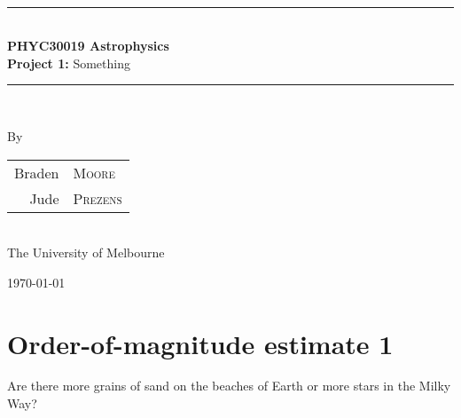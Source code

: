 \documentclass[a4paper]{article} %
\begin{document}
\pagestyle{empty}

\newcommand{\HRule}{\rule{\linewidth}{0.5mm}}

\begin{titlepage}

    \begin{center}
        \textsc{}\\[3cm]

        \HRule \\[0.5cm]
        \Huge \textbf{PHYC30019 Astrophysics}\\[0.5cm]
        \huge \textbf{Project 1:} Something\\[0.5cm] 
        \HRule \\[1.5cm]

        \begin{minipage}{0.5\textwidth}
        \begin{center}

		\vspace{3cm}
        \large By \\[0.75cm]
        \begin{tabular}{rl}
        \Large Braden &\Large \textsc{Moore} \\[0.1cm]
        \Large Jude & \Large \textsc{Prezens} \\    
		\end{tabular}  
		\\[1cm]
        \normalsize \normalfont 
        The University of Melbourne \\[2cm]

        \end{center}
        \end{minipage}

        \vfill

        \large \today
    \end{center}

\newpage
\end{titlepage}
\begin{comment}
\pagestyle{fancy}
\pagenumbering{gobble}
\tableofcontents
\newpage
\end{comment}

\pagestyle{fancy}
\setcounter{page}{1}
\section{Order-of-magnitude estimate 1}
\begin{framed}
Are there more grains of sand on the beaches of Earth or more stars in the Milky Way?
\end{framed}
\end{document}
